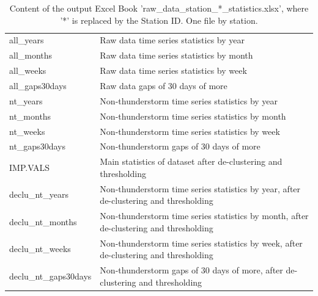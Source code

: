 \documentclass[12pt,twoside]{reedthesis}
\begin{document}
\begingroup\fontsize{8}{10}\selectfont
\begin{longtable}[t]{>{\raggedright\arraybackslash}p{1.2in}>{\raggedright\arraybackslash}p{4.6in}}
\caption[Content of raw\_data\_station\_*\_statistics.xlsx]{\label{tab:rawdatastationidstatistics}Content of the output Excel Book 'raw\_data\_station\_*\_statistics.xlsx', where '*' is replaced by the Station ID. One file by station.}\\
\toprule
\multicolumn{1}{l}{Excel Sheet Name} & \multicolumn{1}{l}{Description}\\
\midrule
all\_years & Raw data time series statistics by year\\
all\_months & Raw data time series statistics by month\\
all\_weeks & Raw data time series statistics by week\\
all\_gaps30days & Raw data gaps of 30 days of more\\
nt\_years & Non-thunderstorm time series statistics by year\\
nt\_months & Non-thunderstorm time series statistics by month\\
nt\_weeks & Non-thunderstorm time series statistics by week\\
nt\_gaps30days & Non-thunderstorm gaps of 30 days of more\\
IMP.VALS & Main statistics of dataset after de-clustering and thresholding\\
declu\_nt\_years & Non-thunderstorm time series statistics by year, after de-clustering and thresholding\\
declu\_nt\_months & Non-thunderstorm time series statistics by month, after de-clustering and thresholding\\
declu\_nt\_weeks & Non-thunderstorm time series statistics by week, after de-clustering and thresholding\\
declu\_nt\_gaps30days & Non-thunderstorm gaps of 30 days of more,  after de-clustering and thresholding\\
\bottomrule
\end{longtable}
\endgroup{}
\end{document}
